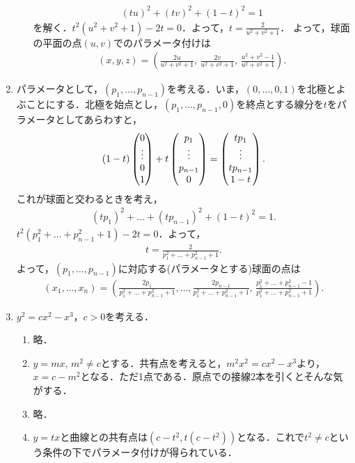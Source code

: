 \documentclass[9pt]{ltjsarticle}
\begin{document}
\begin{enumerate}[label=(問題\arabic*)]
\begin{enumerate}[label=(\alph*)]
\begin{align}
 (tu)^2 + (tv)^2 + (1-t)^2 = 1
\end{align}
を解く．$t^2(u^2+v^2+1)-2t=0$．よって，$t=\frac{2}{u^2+v^2+1}$．
よって，球面の平面の点$(u,v)$でのパラメータ付けは
\begin{align}
 (x,y,z) = (\frac{2u}{u^2+v^2+1},\, \frac{2v}{u^2+v^2+1},\, \frac{u^2+v^2-1}{u^2+v^2+1}).
\end{align}
\end{enumerate}
 \item パラメータとして，$(p_1,\dots,p_{n-1})$を考える．いま，$(0,\dots,0,1)$を北極とよぶことにする．北極を始点とし，$(p_1,\dots,p_{n-1},0)$を終点とする線分を$t$をパラメータとしてあらわすと，
\begin{align}
 (1-t)\left(\begin{matrix} 0 \\ \vdots \\ 0 \\ 1 \end{matrix}\right) + t\left(\begin{matrix} p_1 \\ \vdots \\ p_{n-1}\\ 0 \end{matrix}\right) =
\left(\begin{matrix} tp_1 \\ \vdots \\ tp_{n-1} \\ 1-t \end{matrix}\right).
\end{align}
これが球面と交わるときを考え，
\begin{align}
 (tp_1)^2 + \dots + (tp_{n-1})^2 + (1-t)^2  = 1.
\end{align}
$t^2(p_1^2 + \dots + p_{n-1}^2 + 1) -2t = 0$．よって，
\begin{align}
 t = \frac{2}{p_1^2 + \dots + p_{n-1}^2 + 1}.
\end{align}
よって，$(p_1,\dots,p_{n-1})$に対応する(パラメータとする)球面の点は
\begin{align}
 (x_1,\dots,x_n) =
(\frac{2p_1}{p_1^2+\dots+p_{n-1}^2 + 1},\dots, \frac{2p_{n-1}}{p_1^2+\dots+p_{n-1}^2 + 1},\, \frac{p_1^2+\dots+p_{n-1}^2 - 1}{p_1^2+\dots+p_{n-1}^2 + 1}).
\end{align}
 \item $y^2=cx^2-x^3$，$c>0$を考える．
\begin{enumerate}[label=(\alph*)]
 \item 略．
 \item $y=mx,\, m^2 \neq c$とする．共有点を考えると，$m^2x^2 = cx^2 - x^3$より，
$x=c-m^2$となる．ただ1点である．原点での接線2本を引くとそんな気がする．
 \item 略．
 \item $y=tx$と曲線との共有点は$(c-t^2,t(c-t^2))$となる．これで$t^2\neq c$という条件の下でパラメータ付けが得られている．

\end{enumerate}
\end{enumerate}
\end{document}
